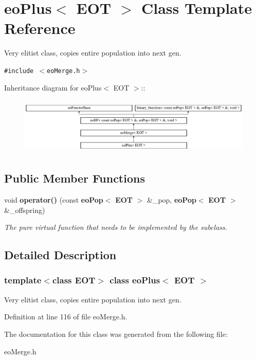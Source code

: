 \section{eo\-Plus$<$ EOT $>$ Class Template Reference}
\label{classeo_plus}
Very elitist class, copies entire population into next gen.  


{\tt \#include $<$eo\-Merge.h$>$}

Inheritance diagram for eo\-Plus$<$ EOT $>$::\begin{figure}[H]
\begin{center}
\leavevmode
\includegraphics[height=2.75184cm]{classeo_plus}
\end{center}
\end{figure}
\subsection*{Public Member Functions}
\begin{CompactItemize}
\item 
void {\bf operator()} (const {\bf eo\-Pop}$<$ {\bf EOT} $>$ \&\_\-pop, {\bf eo\-Pop}$<$ {\bf EOT} $>$ \&\_\-offspring)\label{classeo_plus_a0}

\begin{CompactList}\small\item\em The pure virtual function that needs to be implemented by the subclass. \item\end{CompactList}\end{CompactItemize}


\subsection{Detailed Description}
\subsubsection*{template$<$class EOT$>$ class eo\-Plus$<$ EOT $>$}

Very elitist class, copies entire population into next gen. 



Definition at line 116 of file eo\-Merge.h.

The documentation for this class was generated from the following file:\begin{CompactItemize}
\item 
eo\-Merge.h\end{CompactItemize}
